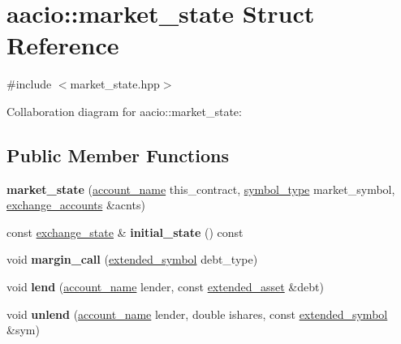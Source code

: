 \hypertarget{structaacio_1_1market__state}{}\section{aacio\+:\+:market\+\_\+state Struct Reference}
\label{structaacio_1_1market__state}


{\ttfamily \#include $<$market\+\_\+state.\+hpp$>$}



Collaboration diagram for aacio\+:\+:market\+\_\+state\+:
\subsection*{Public Member Functions}
\begin{DoxyCompactItemize}
\item 
\mbox{\label{structaacio_1_1market__state_afb73d439d933425d01aefb8f04a66015}} 
{\bfseries market\+\_\+state} (\mbox{\hyperlink{structaacio_1_1chain_1_1name}{account\+\_\+name}} this\+\_\+contract, \mbox{\hyperlink{structaacio_1_1symbol__type}{symbol\+\_\+type}} market\+\_\+symbol, \mbox{\hyperlink{structaacio_1_1exchange__accounts}{exchange\+\_\+accounts}} \&acnts)
\item 
\mbox{\label{structaacio_1_1market__state_ac338e6ce7f330b81bce3467203ef89c9}} 
const \mbox{\hyperlink{structaacio_1_1exchange__state}{exchange\+\_\+state}} \& {\bfseries initial\+\_\+state} () const
\item 
\mbox{\label{structaacio_1_1market__state_aca1efaeb4eb59f48ed45afea6ac0a097}} 
void {\bfseries margin\+\_\+call} (\mbox{\hyperlink{structaacio_1_1extended__symbol}{extended\+\_\+symbol}} debt\+\_\+type)
\item 
\mbox{\label{structaacio_1_1market__state_aca1b7a1024ef2ba99645b63f52067ad7}} 
void {\bfseries lend} (\mbox{\hyperlink{structaacio_1_1chain_1_1name}{account\+\_\+name}} lender, const \mbox{\hyperlink{structaacio_1_1extended__asset}{extended\+\_\+asset}} \&debt)
\item 
\mbox{\label{structaacio_1_1market__state_ae3761c3060bc8e53954a402a862e45aa}} 
void {\bfseries unlend} (\mbox{\hyperlink{structaacio_1_1chain_1_1name}{account\+\_\+name}} lender, double ishares, const \mbox{\hyperlink{structaacio_1_1extended__symbol}{extended\+\_\+symbol}} \&sym)

\end{DoxyCompactItemize}
